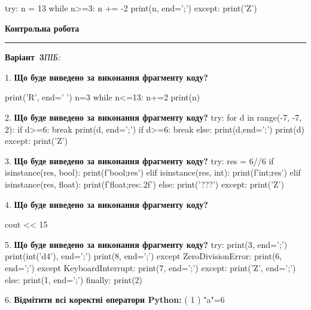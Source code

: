 \documentclass[11pt]{article}
\begin{document}
try:
    n = 13
    while n>=3:
        n += -2
    print(n, end=';')
except:
    print('Z')

\par\vspace{5mm}










\newpage

\newpage

{\centering\Large\bfseries Контрольна робота\par}
\medskip
\noindent\rule{\linewidth}{0.5pt}
\smallskip
\noindent\textbf{Варіант \No\,3}\hfill \textit{ПІБ:}\,\underline{\hspace{60mm}}
\vspace{4mm}

1. \textbf{Що буде виведено за виконання фрагменту коду?}

print('R', end=' ')
n=3
while n<=13:
    n+=2
print(n)

\par\vspace{5mm}
2. \textbf{Що буде виведено за виконання фрагменту коду?}
try:
    for d in range(-7, -7, 2):
        if d>=6:
            break
        print(d, end=';')
        if d>=6:
            break
    else:
        print(d,end=';')
    print(d)
except:
    print('Z')
\par\vspace{5mm}
3. \textbf{Що буде виведено за виконання фрагменту коду?}
try:
    res = 6//6%
    if isinstance(res, bool):
        print(f'bool;{res}')
    elif isinstance(res, int):
        print(f'int;{res}')
    elif isinstance(res, float):
        print(f'float;{res:.2f}')
    else:
        print('???')
except:
    print('Z')
\par\vspace{5mm}
4. \textbf{Що буде виведено за виконання фрагменту коду?}

cout << 15 %
\par\vspace{5mm}
5. \textbf{Що буде виведено за виконання фрагменту коду?}
try:
    print(3, end=';')
    print(int('d4'), end=';')
    print(8, end=';')
except ZeroDivisionError:
    print(6, end=';')
except KeyboardInterrupt:
    print(7, end=';')
except:
    print('Z', end=';')
else:
    print(1, end=';')
finally:
    print(2)
\par\vspace{5mm}
6. %
\textbf{Відмітити всі коректні оператори Python:}
( 1 ) "a"=6
\end{document}

